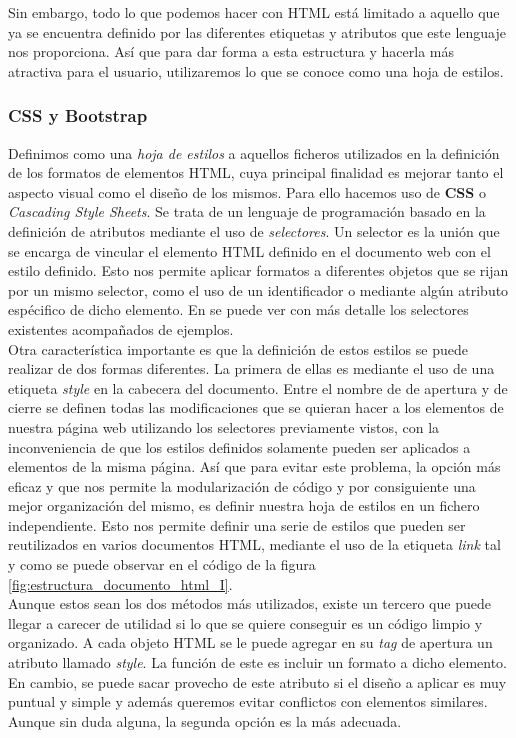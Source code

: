 \documentclass[../main.tex]{subfiles}
\begin{document}
    
    Sin embargo, todo lo que podemos hacer con HTML está limitado a aquello que ya se encuentra definido por las diferentes etiquetas y atributos que este lenguaje nos proporciona. Así que para dar forma a esta estructura y hacerla más atractiva para el usuario, utilizaremos lo que se conoce como una hoja de estilos.

    
    \subsubsection{CSS y Bootstrap}
    Definimos como una \textit{hoja de estilos} a aquellos ficheros utilizados en la definición de los formatos de elementos HTML, cuya principal finalidad es mejorar tanto el aspecto visual como el diseño de los mismos. Para ello hacemos uso de \textbf{CSS} o \textit{Cascading Style Sheets}. Se trata de un lenguaje de programación basado en la definición de atributos mediante el uso de \textit{selectores}. Un selector es la unión que se encarga de vincular el elemento HTML definido en el documento web con el estilo definido. Esto nos permite aplicar formatos a diferentes objetos que se rijan por un mismo selector, como el uso de un identificador o mediante algún atributo espécifico de dicho elemento.  En \cite{selectoresCSS} se puede ver con más detalle los selectores existentes acompañados de ejemplos. \\
 
    
    Otra característica importante es que la definición de estos estilos se puede realizar de dos formas diferentes. La primera de ellas es mediante el uso de una etiqueta \textit{style} en la cabecera del documento. Entre el nombre de  de apertura y de cierre se definen todas las modificaciones que se quieran hacer a los elementos de nuestra página web utilizando los selectores previamente vistos, con la inconveniencia de que los estilos definidos solamente pueden ser aplicados a elementos de la misma página. Así que para evitar este problema, la opción más eficaz y que nos permite la modularización de código y por consiguiente una mejor organización del mismo, es definir nuestra hoja de estilos en un fichero independiente. Esto nos permite definir una serie de estilos que pueden ser reutilizados en varios documentos HTML, mediante el uso de la etiqueta \textit{link} tal y como se puede observar en el código de la figura \ref{fig:estructura_documento_html_I}.\\ 
    
    Aunque estos sean los dos métodos más utilizados, existe un tercero que puede llegar a carecer de utilidad si lo que se quiere conseguir es un código limpio y organizado. A cada objeto HTML se le puede agregar en su \textit{tag} de apertura un atributo llamado \textit{style}. La función de este es incluir un formato a dicho elemento. En cambio, se puede sacar provecho de este atributo si el diseño a aplicar es muy puntual y simple y además queremos evitar conflictos con elementos similares. Aunque sin duda alguna, la segunda opción es la más adecuada.\\
    
\end{document}
